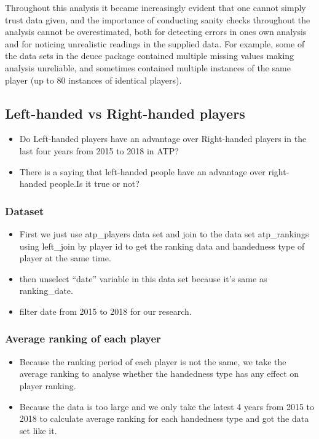 \documentclass[]{article}
\providecommand{\tightlist}{%
  \setlength{\itemsep}{0pt}\setlength{\parskip}{0pt}}
\begin{document}
Throughout this analysis it became increasingly evident that one cannot
simply trust data given, and the importance of conducting sanity checks
throughout the analysis cannot be overestimated, both for detecting
errors in ones own analysis and for noticing unrealistic readings in the
supplied data. For example, some of the data sets in the deuce package
contained multiple missing values making analysis unreliable, and
sometimes contained multiple instances of the same player (up to 80
instances of identical players).

\subsection{Left-handed vs Right-handed
players}\label{left-handed-vs-right-handed-players}

\begin{itemize}
\item
  Do Left-handed players have an advantage over Right-handed players in
  the last four years from 2015 to 2018 in ATP?
\item
  There is a saying that left-handed people have an advantage over
  right-handed people.Is it true or not?
\end{itemize}

\subsubsection{Dataset}\label{dataset}

\begin{itemize}
\tightlist
\item
  First we just use atp\_players data set and join to the data set
  atp\_rankings using left\_join by player id to get the ranking data
  and handedness type of player at the same time.
\item
  then unselect ``date'' variable in this data set because it's same as
  ranking\_date.\\
\item
  filter date from 2015 to 2018 for our research.
\end{itemize}

\subsubsection{Average ranking of each
player}\label{average-ranking-of-each-player}

\begin{itemize}
\tightlist
\item
  Because the ranking period of each player is not the same, we take the
  average ranking to analyse whether the handedness type has any effect
  on player ranking.
\item
  Because the data is too large and we only take the latest 4 years from
  2015 to 2018 to calculate average ranking for each handedness type and
  got the data set like it.
\end{itemize}
\end{document}
